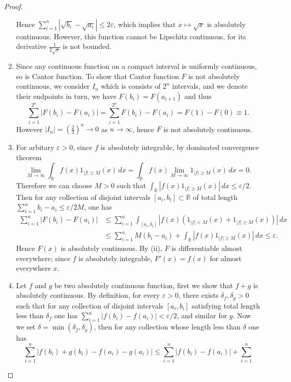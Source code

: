\documentclass[a4paper]{article}
\begin{document}
\begin{proof}
\begin{enumerate}[label = (\roman*)]
    Hence $\sum_{i = 1}^n |\sqrt{b_i} - \sqrt{a_i}| \leq 2\varepsilon$, which implies that $x \mapsto \sqrt{x}$ is absolutely
    continuous. However, this function cannot be Lipschitz continuous, for its derivative $\frac{1}{2\sqrt{x}}$ 
    is not bounded.
    \item Since any continuous function on a compact interval is uniformly continuous, so is Cantor function.
    To show that Cantor function $F$ is not absolutely continuous, we consider $I_n$ which is consists of $2^n$
    intervals, and we denote their endpoints in turn, we have $F(b_i) = F(a_{i + 1})$ and thus$$
    \sum_{i = 1}^{2^n} |F(b_i) - F(a_i)| = \sum_{i = 1}^{2^n} F(b_i) - F(a_i) = F(1) - F(0) \equiv 1.
    $$However $|I_n| = (\frac{2}{3})^n \to 0$ as $n \to \infty$, hence $F$ is not absolutely continuous.
    \item For arbitary $\varepsilon > 0$, since $f$ is absolutely integrable, by dominated convergence theorem 
    $$
    \lim_{M \to \infty} \int_{\mathbb{R}}f(x)1_{|f| \geq M}(x)\,dx = 
    \int_{\mathbb{R}}f(x)\lim_{M \to \infty} 1_{|f| \geq M}(x)\,dx = 0.
    $$Therefore we can choose $M > 0$ such that $\int_{\mathbb{R}}|f(x)1_{|f| \geq M}(x)|\,dx \leq \varepsilon / 2$.
    Then for any collection of disjoint intervals $[a_i, b_i] \subset \mathbb{R}$ of total length 
    $\sum_{i = 1}^n b_i - a_i \leq \varepsilon / 2M$, one has \begin{align*}
    \sum_{i = 1}^n |F(b_i) - F(a_i)| &\leq \sum_{i = 1}^n \int_{[a_i, b_i]} |f(x)(1_{|f| < M}(x) + 1_{|f| \geq M}(x))|\,dx\\
    &\leq \sum_{i = 1}^n M(b_i - a_i) + \int_{\mathbb{R}} |f(x)1_{|f| \geq M}(x)|\,dx \leq \varepsilon.
    \end{align*}
    Hence $F(x)$ is absolutely continuous. By (ii), $F$ is differentiable almost everywhere; since $f$ is absolutely
    integrable, $F'(x) = f(x)$ for almost everywhere $x$.
    \item Let $f$ and $g$ be two absolutely continuous function, first we show that $f + g$ is absolutely continuous.
    By definition, for every $\varepsilon > 0$, there exists $\delta_f, \delta_g > 0$ such that for any collection of
    disjoint intervals $[a_i, b_i]$ satisfying total length less than $\delta_f$ one has $\sum_{i = 1}^n |f(b_i) - f(a_i)| < \varepsilon/2$,
    and similar for $g$. Now we set $\delta = \min(\delta_f, \delta_g)$, then for any collection whose length less than
    $\delta$ one has $$
    \sum_{i = 1}^n |f(b_i) + g(b_i) - f(a_i) - g(a_i)| \leq \sum_{i = 1}^n |f(b_i) - f(a_i)| + \sum_{i = 1}^n 
$$
\end{enumerate}
\end{proof}
\end{document}
